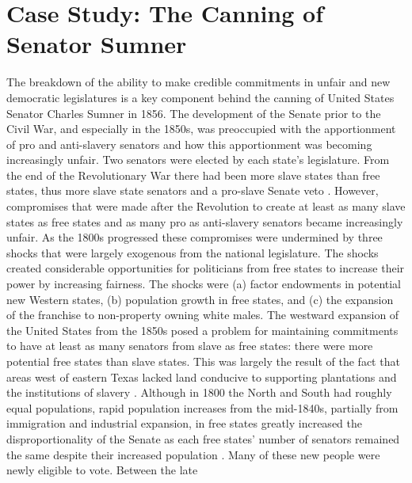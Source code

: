 \documentclass[a4paper]{article}\usepackage[]{graphicx}\usepackage[]{color}
\begin{document}
\section{Case Study: The Canning of Senator Sumner}

The breakdown of the ability to make credible commitments in unfair and new democratic legislatures is a key component behind the canning of United States Senator Charles Sumner in 1856. The development of the Senate prior to the Civil War, and especially in the 1850s, was preoccupied with the apportionment of pro and anti-slavery senators and how this apportionment was becoming increasingly unfair. Two senators were elected by each state's legislature. From the end of the Revolutionary War there had been more slave states than free states, thus more slave state senators and a pro-slave Senate veto \cite[see][151]{Weingast1998}. However, compromises that were made after the Revolution to create at least as many slave states as free states and as many pro as anti-slavery senators became increasingly unfair. As the 1800s progressed these compromises were undermined by three shocks that were largely exogenous from the national legislature. The shocks created considerable opportunities for politicians from free states to increase their power by increasing fairness. The shocks were (a) factor endowments in potential new Western states, (b) population growth in free states, and (c) the expansion of the franchise to non-property owning white males.  The westward expansion of the United States from the 1850s posed a problem for maintaining commitments to have at least as many senators from slave as free states: there were more potential free states than slave states. This was largely the result of the fact that areas west of eastern Texas lacked land conducive to supporting plantations and the institutions of slavery \cite[see][]{Ramsdell1929,Weingast1998,Sokoloff2000}. Although in 1800 the North and South had roughly equal populations, rapid population increases from the mid-1840s, partially from immigration and industrial expansion, in free states greatly increased the disproportionality of the Senate as each free states' number of senators remained the same despite their increased population \cite[see][184]{Weingast1998}. Many of these new people were newly eligible to vote. Between the late 
\end{document}
